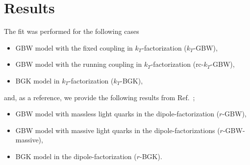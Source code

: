 \documentclass[12pt]{article}
\numberwithin{equation}{section}
\numberwithin{table}{section}
\numberwithin{figure}{section}
\begin{document}
%
\section{Results}
\label{Results}
%
The fit was performed for the following cases
\begin{itemize}
\item GBW model with the fixed coupling in $k_T$-factorization  ($k_T$-GBW),
\item GBW model with the running coupling in $k_T$-factorization (rc-$k_T$-GBW),
\item BGK model in $k_T$-factorization ($k_T$-BGK),
\end{itemize} 
and, as a reference, we provide the following results from Ref.~\cite{Goda:2022wsc};
\begin{itemize}
\item GBW model with massless light quarks in the dipole-factorization ($r$-GBW),
\item GBW model with massive light quarks in the dipole-factorizations ($r$-GBW-massive),
\item  BGK model in  the dipole-factorization ($r$-BGK).
\end{itemize} 
\end{document}
